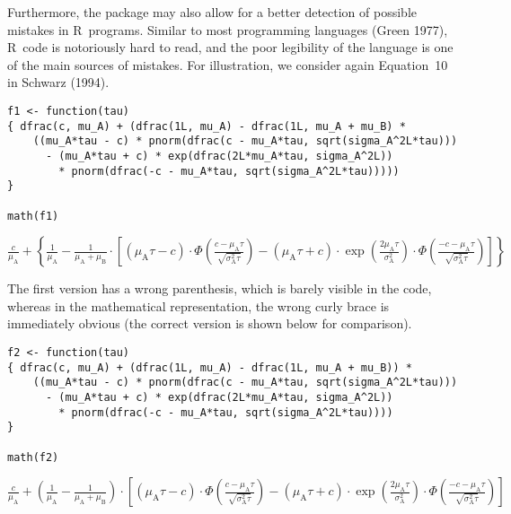 Furthermore, the package may also allow for a better detection of
possible mistakes in R~programs. Similar to most programming languages
(Green 1977), R~code is notoriously hard to read, and the poor
legibility of the language is one of the main sources of mistakes. For
illustration, we consider again Equation~10 in Schwarz (1994).

\begin{verbatim}
f1 <- function(tau)
{ dfrac(c, mu_A) + (dfrac(1L, mu_A) - dfrac(1L, mu_A + mu_B) * 
    ((mu_A*tau - c) * pnorm(dfrac(c - mu_A*tau, sqrt(sigma_A^2L*tau)))
      - (mu_A*tau + c) * exp(dfrac(2L*mu_A*tau, sigma_A^2L))
        * pnorm(dfrac(-c - mu_A*tau, sqrt(sigma_A^2L*tau)))))
}

math(f1)
\end{verbatim}

\({\displaystyle{\frac{c}{{\mu}_{\mathrm{A}}}}}{+}{\left\{{\displaystyle{\frac{1}{{\mu}_{\mathrm{A}}}}}{-}{{\displaystyle{\frac{1}{{{\mu}_{\mathrm{A}}}{+}{{\mu}_{\mathrm{B}}}}}}{\cdot}{\left[{{\left({{{\mu}_{\mathrm{A}}}{{}}{\tau}}{-}{c}\right)}{\cdot}{\Phi{\left(\displaystyle{\frac{{c}{-}{{{\mu}_{\mathrm{A}}}{{}}{\tau}}}{\sqrt{{{\sigma}_{\mathrm{A}}^{2}}{{}}{\tau}}}}\right)}}}{-}{{{\left({{{\mu}_{\mathrm{A}}}{{}}{\tau}}{+}{c}\right)}{\cdot}{\exp{\left(\displaystyle{\frac{{{2}{{}}{{\mu}_{\mathrm{A}}}}{{}}{\tau}}{{\sigma}_{\mathrm{A}}^{2}}}\right)}}}{\cdot}{\Phi{\left(\displaystyle{\frac{{{-}{c}}{-}{{{\mu}_{\mathrm{A}}}{{}}{\tau}}}{\sqrt{{{\sigma}_{\mathrm{A}}^{2}}{{}}{\tau}}}}\right)}}}\right]}}\right\}}\)

The first version has a wrong parenthesis, which is barely visible in
the code, whereas in the mathematical representation, the wrong curly
brace is immediately obvious (the correct version is shown below for
comparison).

\begin{verbatim}
f2 <- function(tau)
{ dfrac(c, mu_A) + (dfrac(1L, mu_A) - dfrac(1L, mu_A + mu_B)) * 
    ((mu_A*tau - c) * pnorm(dfrac(c - mu_A*tau, sqrt(sigma_A^2L*tau)))
      - (mu_A*tau + c) * exp(dfrac(2L*mu_A*tau, sigma_A^2L))
        * pnorm(dfrac(-c - mu_A*tau, sqrt(sigma_A^2L*tau))))
}

math(f2)
\end{verbatim}

\({\displaystyle{\frac{c}{{\mu}_{\mathrm{A}}}}}{+}{{\left({\displaystyle{\frac{1}{{\mu}_{\mathrm{A}}}}}{-}{\displaystyle{\frac{1}{{{\mu}_{\mathrm{A}}}{+}{{\mu}_{\mathrm{B}}}}}}\right)}{\cdot}{\left[{{\left({{{\mu}_{\mathrm{A}}}{{}}{\tau}}{-}{c}\right)}{\cdot}{\Phi{\left(\displaystyle{\frac{{c}{-}{{{\mu}_{\mathrm{A}}}{{}}{\tau}}}{\sqrt{{{\sigma}_{\mathrm{A}}^{2}}{{}}{\tau}}}}\right)}}}{-}{{{\left({{{\mu}_{\mathrm{A}}}{{}}{\tau}}{+}{c}\right)}{\cdot}{\exp{\left(\displaystyle{\frac{{{2}{{}}{{\mu}_{\mathrm{A}}}}{{}}{\tau}}{{\sigma}_{\mathrm{A}}^{2}}}\right)}}}{\cdot}{\Phi{\left(\displaystyle{\frac{{{-}{c}}{-}{{{\mu}_{\mathrm{A}}}{{}}{\tau}}}{\sqrt{{{\sigma}_{\mathrm{A}}^{2}}{{}}{\tau}}}}\right)}}}\right]}}\)

